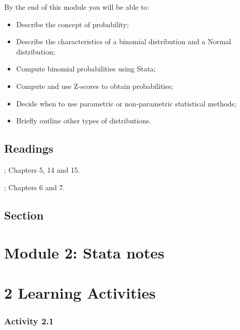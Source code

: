 \documentclass[
]{memoir}
\providecommand{\tightlist}{%
  \setlength{\itemsep}{0pt}\setlength{\parskip}{0pt}}
\begin{document}
By the end of this module you will be able to:

\begin{itemize}
\tightlist
\item
  Describe the concept of probability;
\item
  Describe the characteristics of a binomial distribution and a Normal distribution;
\item
  Compute binomial probabilities using Stata;
\item
  Compute and use Z-scores to obtain probabilities;
\item
  Decide when to use parametric or non-parametric statistical methods;
\item
  Briefly outline other types of distributions.
\end{itemize}

\hypertarget{readings-1}{%
\section*{Readings}\label{readings-1}}

\citet{kirkwood_sterne01}; Chapters 5, 14 and 15.

\citet{bland15}; Chapters 6 and 7.

\hypertarget{section}{%
\section{Section}\label{section}}

\hypertarget{module-2-stata-notes}{%
\chapter*{\texorpdfstring{\textbf{Module 2: Stata notes}}{Module 2: Stata notes}}\label{module-2-stata-notes}}

\hypertarget{learning-activities-1}{%
\chapter*{\texorpdfstring{\textbf{2} Learning Activities}{2 Learning Activities}}\label{learning-activities-1}}

\hypertarget{activity-2.1}{%
\subsection*{Activity 2.1}\label{activity-2.1}}
\end{document}
